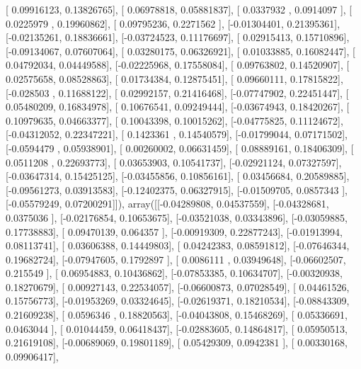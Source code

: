 \documentclass{article}
\begin{document}
       [ 0.09916123,  0.13826765],
       [ 0.06978818,  0.05881837],
       [ 0.0337932 ,  0.0914097 ],
       [ 0.0225979 ,  0.19960862],
       [ 0.09795236,  0.2271562 ],
       [-0.01304401,  0.21395361],
       [-0.02135261,  0.18836661],
       [-0.03724523,  0.11176697],
       [ 0.02915413,  0.15710896],
       [-0.09134067,  0.07607064],
       [ 0.03280175,  0.06326921],
       [ 0.01033885,  0.16082447],
       [ 0.04792034,  0.04449588],
       [-0.02225968,  0.17558084],
       [ 0.09763802,  0.14520907],
       [ 0.02575658,  0.08528863],
       [ 0.01734384,  0.12875451],
       [ 0.09660111,  0.17815822],
       [-0.028503  ,  0.11688122],
       [ 0.02992157,  0.21416468],
       [-0.07747902,  0.22451447],
       [ 0.05480209,  0.16834978],
       [ 0.10676541,  0.09249444],
       [-0.03674943,  0.18420267],
       [ 0.10979635,  0.04663377],
       [ 0.10043398,  0.10015262],
       [-0.04775825,  0.11124672],
       [-0.04312052,  0.22347221],
       [ 0.1423361 ,  0.14540579],
       [-0.01799044,  0.07171502],
       [-0.0594479 ,  0.05938901],
       [ 0.00260002,  0.06631459],
       [ 0.08889161,  0.18406309],
       [ 0.0511208 ,  0.22693773],
       [ 0.03653903,  0.10541737],
       [-0.02921124,  0.07327597],
       [-0.03647314,  0.15425125],
       [-0.03455856,  0.10856161],
       [ 0.03456684,  0.20589885],
       [-0.09561273,  0.03913583],
       [-0.12402375,  0.06327915],
       [-0.01509705,  0.0857343 ],
       [-0.05579249,  0.07200291]]), array([[-0.04289808,  0.04537559],
       [-0.04328681,  0.0375036 ],
       [-0.02176854,  0.10653675],
       [-0.03521038,  0.03343896],
       [-0.03059885,  0.17738883],
       [ 0.09470139,  0.064357  ],
       [-0.00919309,  0.22877243],
       [-0.01913994,  0.08113741],
       [ 0.03606388,  0.14449803],
       [ 0.04242383,  0.08591812],
       [-0.07646344,  0.19682724],
       [-0.07947605,  0.1792897 ],
       [ 0.0086111 ,  0.03949648],
       [-0.06602507,  0.215549  ],
       [ 0.06954883,  0.10436862],
       [-0.07853385,  0.10634707],
       [-0.00320938,  0.18270679],
       [ 0.00927143,  0.22534057],
       [-0.06600873,  0.07028549],
       [ 0.04461526,  0.15756773],
       [-0.01953269,  0.03324645],
       [-0.02619371,  0.18210534],
       [-0.08843309,  0.21609238],
       [ 0.0596346 ,  0.18820563],
       [-0.04043808,  0.15468269],
       [ 0.05336691,  0.0463044 ],
       [ 0.01044459,  0.06418437],
       [-0.02883605,  0.14864817],
       [ 0.05950513,  0.21619108],
       [-0.00689069,  0.19801189],
       [ 0.05429309,  0.0942381 ],
       [ 0.00330168,  0.09906417],
\end{document}
